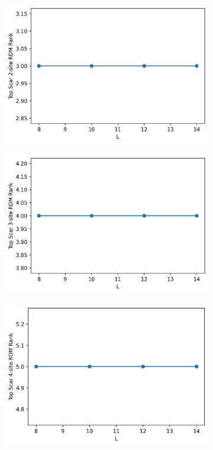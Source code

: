 \documentclass[11pt]{article}
\begin{document}
\begin{itemize}
    \begin{figure}[H]
    \centering
    \begin{subfigure}{0.45\textwidth}
        \includegraphics[width=\linewidth]{hb_scar_2.png}
        \caption{}
        \label{fig:image1h}
    \end{subfigure}
    \begin{subfigure}{0.45\textwidth}
        \includegraphics[width=\linewidth]{hb_scar_3.png}
        \caption{}
        \label{fig:image2hb}
    \end{subfigure}    %
    \begin{subfigure}{0.45\textwidth}
        \includegraphics[width=\linewidth]{hb_scar_4.png}

\end{subfigure}
\end{figure}
\end{itemize}
\end{document}
